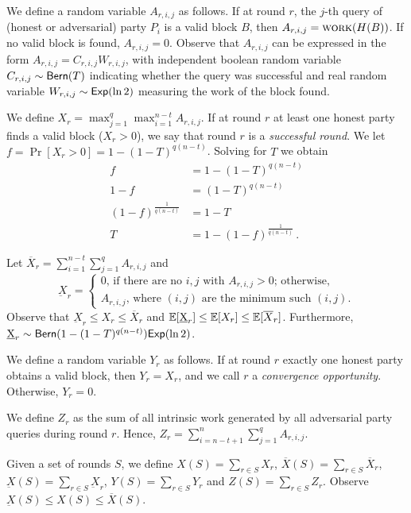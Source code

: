 We define a random variable $A_{r, i, j}$ as follows.
If at round $r$, the $j$-th query of (honest or adversarial) party $P_i$ is a valid block $B$,
then $A_{r, i, j} = \textsc{work}(H(B))$.
If no valid block is found, $A_{r, i, j} = 0$.
Observe that $A_{r, i, j}$ can be expressed in the form $A_{r, i, j} = C_{r, i, j} W_{r, i, j}$,
with independent boolean random variable $C_{r, i, j} \sim \textsf{Bern}(T)$ indicating whether the query was successful
and real random variable $W_{r, i, j} \sim \textsf{Exp}(\ln2)$ measuring the work of the block found.

We define $X_{r} = \max_{j=1}^q \max_{i = 1}^{n - t} A_{r, i, j}$.
If at round $r$ at least one honest party finds a valid block ($X_r > 0$),
we say that round $r$ is a \emph{successful round}.
We let $f = \Pr[X_r > 0] = 1 - (1 - T)^{q(n - t)}$.
Solving for $T$ we obtain
\begin{align*}
  f &= 1 - (1 - T)^{q(n - t)}\\
  1 - f &= (1 - T)^{q(n - t)}\\
  (1 - f)^{\frac{1}{q(n - t)}} &= 1 - T\\
  T &= 1 - (1 - f)^{\frac{1}{q(n - t)}}\,.
\end{align*}

Let $\overline{X}_r = \sum_{i = 1}^{n - t} \sum_{j = 1}^q A_{r,i,j}$ and
\[
  \underbar{X}_r = \begin{cases}
  0 \text{, if there are no $i, j$ with $A_{r,i,j} > 0$; otherwise,}\\
  A_{r,i,j} \text{, where $(i, j)$ are the minimum such $(i, j)$.}
\end{cases}\]
Observe that $\underbar{X}_r \leq X_r \leq \overline{X}_r$
and $\mathop{{}\mathbb{E}}[\underbar{X}_r] \leq \mathop{{}\mathbb{E}}[X_r] \leq \mathop{{}\mathbb{E}}[\overline{X}_r]$.
Furthermore, $\underbar{X}_r \sim \textsf{Bern}(1 - (1 - T)^{q(n - t)}) \textsf{Exp}(\ln 2)$.

We define a random variable $Y_r$ as follows.
If at round $r$ exactly one honest party obtains a valid block, then $Y_r = X_r$,
and we call $r$ a \emph{convergence opportunity}. Otherwise, $Y_r = 0$.

We define $Z_{r}$ as the sum of all intrinsic work generated by all adversarial
party queries during round $r$. Hence, $Z_{r} = \sum_{i = n - t + 1}^n \sum_{j = 1}^q A_{r, i, j}$.

Given a set of rounds $S$, we define
$X(S) = \sum_{r \in S} X_r$,
$\overline{X}(S) = \sum_{r \in S} \overline{X}_r$,
$\underbar{X}(S) = \sum_{r \in S} \underbar{X}_r$,
$Y(S) = \sum_{r \in S} Y_r$
and $Z(S) = \sum_{r \in S} Z_r$.
Observe $\underbar{X}(S) \leq X(S) \leq \overline{X}(S)$.

